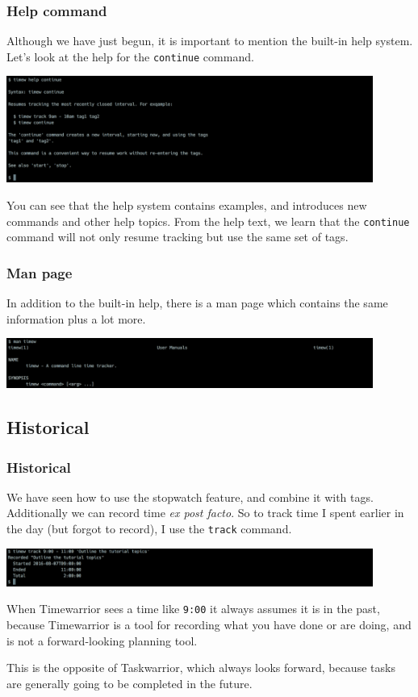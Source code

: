 \documentclass[t,handout]{beamer}
\begin{document}
\begin{frame}[fragile]\frametitle{Help command}
    Although we have just begun, it is important to mention the built-in help system. Let's look at the help for the \verb=continue= command.

    \includegraphics[width=12cm]{images/tutorial13.png}

    You can see that the help system contains examples, and introduces new commands and other help topics. From the help text, we learn that the \verb=continue= command will not only resume tracking but use the same set of tags.
\end{frame}

\begin{frame}[fragile]\frametitle{Man page}
    In addition to the built-in help, there is a man page which contains the same information plus a lot more.

    \includegraphics[width=12cm]{images/tutorial14.png}
\end{frame}

\subsection{Historical}

\begin{frame}[fragile]\frametitle{Historical}
    We have seen how to use the stopwatch feature, and combine it with tags. Additionally we can record time \textit{ex post facto}. So to track time I spent earlier in the day (but forgot to record), I use the \verb=track= command.

    \includegraphics[width=12cm]{images/tutorial15.png}

    When Timewarrior sees a time like \verb=9:00= it always assumes it is in the past, because Timewarrior is a tool for recording what you have done or are doing, and is not a forward-looking planning tool.

    This is the opposite of Taskwarrior, which always looks forward, because tasks are generally going to be completed in the future.
\end{frame}
\end{document}
